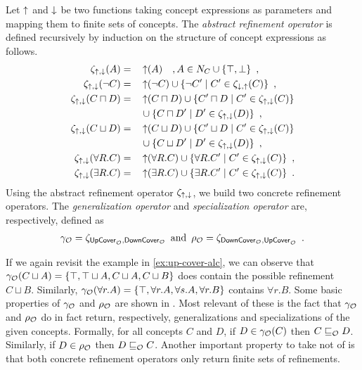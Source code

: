 \begin{definition}
  Let $\mathop{\uparrow}$ and $\mathop{\downarrow}$ be two functions taking concept expressions as parameters and mapping them to finite sets of concepts.
  The \emph{abstract refinement operator} is defined recursively by induction on the structure of concept expressions as follows.
  \begin{alignat*}{2}
    \zeta_{\mathop{\uparrow},\mathop{\downarrow}}(A) &= && \mathop{\uparrow}(A) \quad, A \in N_C \cup \{\top, \bot\} \enspace, \\
    \zeta_{\mathop{\uparrow},\mathop{\downarrow}}(\lnot C) &= && \mathop{\uparrow}(\lnot C) \cup \{ \lnot C' \mid C' \in \zeta_{\mathop{\downarrow},\mathop{\uparrow}}(C) \} \enspace, \\
    \zeta_{\mathop{\uparrow},\mathop{\downarrow}}(C \sqcap D) &= && \mathop{\uparrow}(C \sqcap D) \cup \{ C' \sqcap D \mid C' \in \zeta_{\mathop{\uparrow},\mathop{\downarrow}}(C) \} \\
    &&& \cup \{ C \sqcap D' \mid D' \in \zeta_{\mathop{\uparrow},\mathop{\downarrow}}(D) \} \enspace, \\
    \zeta_{\mathop{\uparrow},\mathop{\downarrow}}(C \sqcup D) &= && \mathop{\uparrow}(C \sqcup D) \cup \{ C' \sqcup D \mid C' \in \zeta_{\mathop{\uparrow},\mathop{\downarrow}}(C) \} \\
    &&& \cup \{ C \sqcup D' \mid D' \in \zeta_{\mathop{\uparrow},\mathop{\downarrow}}(D) \} \enspace, \\
    \zeta_{\mathop{\uparrow},\mathop{\downarrow}}(\forall R.C) &= && \mathop{\uparrow}(\forall R.C)
    \cup \{ \forall R.C' \mid C' \in \zeta_{\mathop{\uparrow},\mathop{\downarrow}}(C) \} \enspace, \\
    \zeta_{\mathop{\uparrow},\mathop{\downarrow}}(\exists R.C) &= && \mathop{\uparrow}(\exists R.C)
    \cup \{ \exists R.C' \mid C' \in \zeta_{\mathop{\uparrow},\mathop{\downarrow}}(C) \} \enspace.
  \end{alignat*}
  Using the abstract refinement operator $\zeta_{\mathop{\uparrow},\mathop{\downarrow}}$, we build two concrete refinement operators. The \emph{generalization operator} and \emph{specialization operator} are, respectively, defined as
  \begin{align*}
    \gamma_\mathcal{O} = \zeta_{{\mathsf{UpCover}}_\mathcal{O},{\mathsf{DownCover}}_\mathcal{O}} \enspace \text{and} \enspace
    \rho_\mathcal{O} = \zeta_{{\mathsf{DownCover}}_\mathcal{O},{\mathsf{UpCover}}_\mathcal{O}} \enspace.
  \end{align*}
\end{definition}

If we again revisit the example in \cref{ex:up-cover-alc}, we can observe that $\gamma_\mathcal{O}(C \sqcup A) = \{ \top, \top \sqcup A, C \sqcup A, C \sqcup B \}$ does contain the possible refinement $C \sqcup B$. Similarly, $\gamma_\mathcal{O}(\forall r.A) = \{ \top, \forall r.A, \forall s.A, \forall r.B \}$ contains $\forall r.B$. Some basic properties of $\gamma_\mathcal{O}$ and $\rho_\mathcal{O}$ are shown in \cite{troquard2018repairing}. Most relevant of these is the fact that $\gamma_\mathcal{O}$ and $\rho_\mathcal{O}$ do in fact return, respectively, generalizations and specializations of the given concepts. Formally, for all concepts $C$ and $D$, if $D \in \gamma_\mathcal{O}(C)$ then $C \sqsubseteq_\mathcal{O} D$. Similarly, if $D \in \rho_\mathcal{O}$ then $D \sqsubseteq_\mathcal{O} C$. Another important property to take not of is that both concrete refinement operators only return finite sets of refinements.

